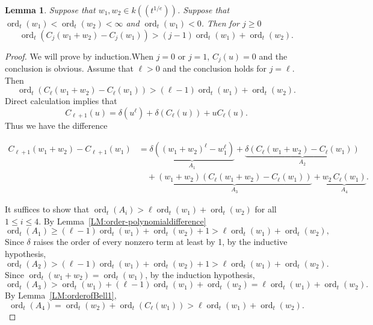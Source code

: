 \documentclass{article}
\newtheorem{lemma}[theorem]{Lemma}
\DeclareMathOperator{\ord}{ord}
\newcommand{\dd}{\delta}
\begin{document}
\begin{lemma}
  \label{LM:orderofBell2}
  Suppose that $w_1,w_2\in k((t^{1/e}))$. Suppose that 
  $\ord_t(w_1)<\ord_t(w_2)<\infty$ and $\ord_t(w_1)<0$. Then for $j\geq 0$
  $$
     \ord_t(C_j(w_1+w_2)-C_j(w_1))> (j-1)\ord_t(w_1)+\ord_t(w_2).
  $$
\end{lemma}
\begin{proof}
We will prove by induction.When $j=0$ or $j=1$, $C_j(u)=0$ and the conclusion is obvious.
Assume that $\ell>0$ and the conclusion holds for $j=\ell$. Then
$$
   \ord_t(C_{\ell}(w_1+w_2)-C_{\ell}(w_1))> (\ell-1)\ord_t(w_1)+\ord_t(w_2).
$$
Direct calculation implies that
\[C_{\ell+1}(u) = \dd(u^{\ell})+\dd(C_{\ell}(u))+uC_{\ell}(u).\]
Thus we have the difference

\begin{align*}
  C_{\ell+1}(w_1+w_2) - C_{\ell+1}(w_1)
  &= \underbrace{\dd \left((w_1+w_2)^{\ell}-w_1^{\ell}\right)}_{A_1}
   + \underbrace{\dd \left(C_\ell(w_1+w_2) - C_\ell(w_1)\right)}_{A_2} \\
  &\quad + \underbrace{(w_1+w_2)\left(C_\ell(w_1+w_2)-C_\ell(w_1)\right)}_{A_3}
   + \underbrace{ w_2 \, C_\ell(w_1)}_{A_4}.
\end{align*}

It suffices to show that $\ord_t(A_i)>\ell\ord_t(w_1)+\ord_t(w_2)$ for all $1\leq i \leq 4$.
By Lemma~\ref{LM:order-polynomialdifference} 
$$
\ord_t(A_1)\geq (\ell-1)\ord_t(w_1)+\ord_t(w_2)+1>\ell\ord_t(w_1)+\ord_t(w_2),
$$
 Since $\dd$ raises the order of every nonzero term at least by 1, by the inductive hypothesis,  
$$\ord_t(A_2)>(\ell-1)\ord_t(w_1) + \ord_t(w_2)+1>\ell\ord_t(w_1)+\ord_t(w_2).$$
Since $\ord_t(w_1+w_2) = \ord_t(w_1)$, by the induction hypothesis,
$$
\ord_t(A_3)>\ord_t(w_1) + (\ell-1)\ord_t(w_1) + \ord_t(w_2) = \ell\ord_t(w_1) + \ord_t(w_2).
$$
By Lemma~\ref{LM:orderofBell1}, 
$$
 \ord_t(A_4)=\ord_t(w_2)+\ord_t(C_\ell(w_1))>\ell\ord_t(w_1)+\ord_t(w_2).
$$
\end{proof}
\end{document}
